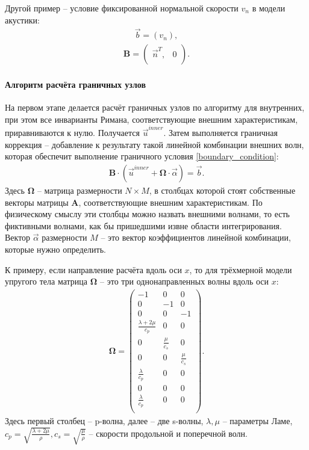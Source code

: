 Другой пример -- условие фиксированной нормальной скорости $v_n$ в модели акустики:
\begin{eqnarray}
	\vec{b} = (v_n),
\end{eqnarray}
\begin{align}
\label{fixed_normal_velocity_acoustic}
	\mathbf{B} =
	\left( \begin{array}{cccccccccccc}
	 \vec{n}^T, & 0 \\
	\end{array} \right).
\end{align}

\paragraph{Алгоритм расчёта граничных узлов}
\label{sec:good-border-case}
На первом этапе делается расчёт граничных узлов по алгоритму для внутренних, 
при этом все инварианты Римана, соответствующие внешним характеристикам, приравниваются к нулю. 
Получается $\vec{u}^{inner}$. Затем выполняется граничная коррекция -- 
добавление к результату такой линейной комбинации внешних волн, 
которая обеспечит выполнение граничного условия \eqref{boundary_condition}:
\begin{eqnarray}
	\mathbf{B} \cdot (\vec{u}^{inner} + \mathbf{\Omega} \cdot \vec{\alpha}) = \vec{b}.
\end{eqnarray}
Здесь $\mathbf{\Omega}$ -- матрица размерности $N \times M$, 
в столбцах которой стоят собственные векторы 
матрицы $\mathbf{A}$, соответствующие внешним характеристикам.
По физическому смыслу эти столбцы можно назвать внешними волнами,
то есть фиктивными волнами, как бы пришедшими извне области интегрирования.
Вектор $\vec{\alpha}$ размерности $M$ -- это вектор
коэффициентов линейной комбинации, которые нужно определить.

К примеру, если направление расчёта вдоль оси $x$, то 
для трёхмерной модели упругого тела матрица $\mathbf{\Omega}$ -- 
это три однонаправленных волны вдоль оси $x$:
\begin{align}
\label{Omega_for_elastic3D}
	\mathbf{\Omega} =
	\left( \begin{array}{cccccccccccc}
	-1 & 0  &  0 \\
	 0 & -1 &  0 \\
	 0 &  0 & -1 \\
	\frac{\lambda+2\mu}{c_p} & 0 & 0 \\
	0 & \frac{\mu}{c_s} & 0 \\
	0 & 0 & \frac{\mu}{c_s} \\
	\frac{\lambda}{c_p} & 0 & 0 \\
	0 & 0 & 0 \\
	\frac{\lambda}{c_p} & 0 & 0 \\
	\end{array} \right).
\end{align} 
Здесь первый столбец -- p-волна, далее -- две s-волны, 
$\lambda, \mu$ -- параметры Ламе, 
$c_p = \sqrt{\frac{\lambda + 2\mu}{\rho}}, c_s = \sqrt{\frac{\mu}{\rho}}$ -- 
скорости продольной и поперечной волн.

